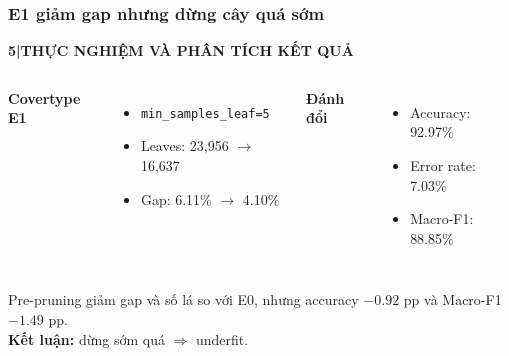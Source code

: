\documentclass[aspectratio=169,12pt]{beamer}
\newcommand{\chaptertag}[2]{%
  \vspace{-0.16cm}%
  {\scriptsize\bfseries\textcolor{boxframe}{#1\enspace |\enspace #2}}\par
  \vspace{0.12cm}%
}
\begin{document}
\begin{frame}
  \frametitle{E1 giảm gap nhưng dừng cây quá sớm}
  \chaptertag{5}{THỰC NGHIỆM VÀ PHÂN TÍCH KẾT QUẢ}
  \begin{columns}[T,onlytextwidth]
      \textbf{Covertype E1}
      \begin{itemize}
        \item \texttt{min\_samples\_leaf=5}
        \item Leaves: 23,956 $\rightarrow$ 16,637
        \item Gap: 6.11\% $\rightarrow$ 4.10\%
      \end{itemize}
      \textbf{Đánh đổi}
      \begin{itemize}
        \item Accuracy: 92.97\%
        \item Error rate: 7.03\%
        \item Macro-F1: 88.85\%
      \end{itemize}
  \end{columns}
  \vspace{0.35cm}
  \begin{tcolorbox}[riskbox,width=0.90\textwidth,top=2mm,bottom=2mm]
    \centering
    Pre-pruning giảm gap và số lá so với E0, nhưng accuracy $-0.92$ pp và Macro-F1 $-1.49$ pp.\\
    \textbf{Kết luận:} dừng sớm quá $\Rightarrow$ underfit.
  \end{tcolorbox}
\end{frame}
\end{document}
